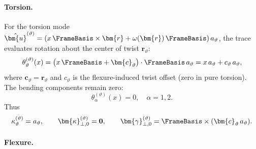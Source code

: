 \paragraph{Torsion.}

For the torsion mode 
$\hat{\bm{u}}^{(\vartheta)} = (x\,\FrameBasis\times\bm{r} + \omega(\bm{r})\,\FrameBasis)\,a_\vartheta$,
the trace evaluates rotation about the center of twist $\bm{r}_\vartheta$:
\begin{equation}
\theta_\vartheta^{(\vartheta)}(x)
=
\big(x\,\FrameBasis + \bm{c}_\vartheta\big)\cdot\FrameBasis\,a_\vartheta
=
x\,a_\vartheta + c_\vartheta\,a_\vartheta,
\end{equation}
where $\bm{c}_\vartheta = \bm{r}_\vartheta$ and $c_\vartheta$ is the 
flexure-induced twist offset (zero in pure torsion). The bending components 
remain zero:
\begin{equation}
\theta_\alpha^{(\vartheta)}(x) = 0,\quad \alpha=1,2.
\end{equation}
Thus
\begin{equation}
\kappa_\vartheta^{(\vartheta)} = a_\vartheta,
\qquad
\bm{\kappa}_{\perp,0}^{(\vartheta)} = \mathbf{0},
\qquad
\bm{\gamma}_{\perp,0}^{(\vartheta)} = \FrameBasis\times(\bm{c}_\vartheta\,a_\vartheta).
\end{equation}

\paragraph{Flexure.}

